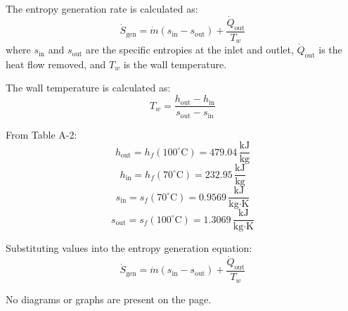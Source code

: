 The entropy generation rate is calculated as:  
\[
\dot{S}_{\text{gen}} = \dot{m} (s_{\text{in}} - s_{\text{out}}) + \frac{\dot{Q}_{\text{out}}}{T_w}
\]  
where \( s_{\text{in}} \) and \( s_{\text{out}} \) are the specific entropies at the inlet and outlet, \( \dot{Q}_{\text{out}} \) is the heat flow removed, and \( T_w \) is the wall temperature.  

The wall temperature is calculated as:  
\[
T_w = \frac{h_{\text{out}} - h_{\text{in}}}{s_{\text{out}} - s_{\text{in}}}
\]  

From Table A-2:  
\[
h_{\text{out}} = h_f(100^\circ\text{C}) = 479.04 \, \frac{\text{kJ}}{\text{kg}}
\]  
\[
h_{\text{in}} = h_f(70^\circ\text{C}) = 232.95 \, \frac{\text{kJ}}{\text{kg}}
\]  
\[
s_{\text{in}} = s_f(70^\circ\text{C}) = 0.9569 \, \frac{\text{kJ}}{\text{kg·K}}
\]  
\[
s_{\text{out}} = s_f(100^\circ\text{C}) = 1.3069 \, \frac{\text{kJ}}{\text{kg·K}}
\]  

Substituting values into the entropy generation equation:  
\[
\dot{S}_{\text{gen}} = \dot{m} (s_{\text{in}} - s_{\text{out}}) + \frac{\dot{Q}_{\text{out}}}{T_w}
\]  

No diagrams or graphs are present on the page.